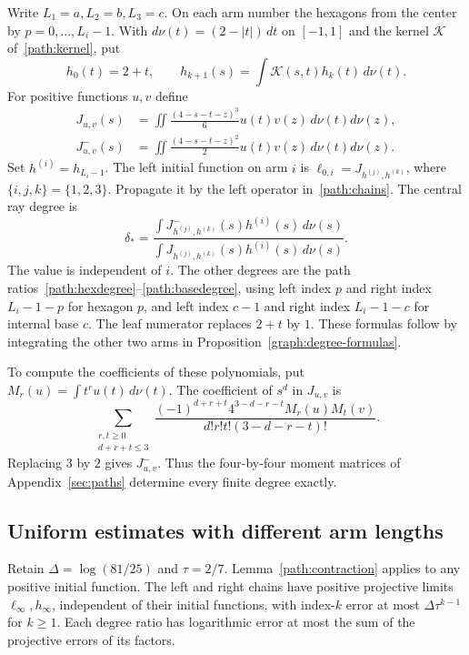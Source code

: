 Write $L_1=a,L_2=b,L_3=c$. On each arm number the hexagons from the
center by $p=0,\ldots,L_i-1$. With $d\nu(t)=(2-|t|)\,dt$ on $[-1,1]$
and the kernel $\mathcal K$ of~\eqref{path:kernel}, put
\[
 h_0(t)=2+t,\qquad
 h_{k+1}(s)=\int\mathcal K(s,t)h_k(t)\,d\nu(t).
\]
For positive functions $u,v$ define
\begin{align}
 J_{u,v}(s)&=\iint\frac{(4-s-t-z)^3}{6}
                u(t)v(z)\,d\nu(t)d\nu(z),\label{spider:J}\\
 J^-_{u,v}(s)&=\iint\frac{(4-s-t-z)^2}{2}
                u(t)v(z)\,d\nu(t)d\nu(z).\label{spider:Jminus}
\end{align}
Set $h^{(i)}=h_{L_i-1}$. The left initial function on arm $i$ is
$\ell_{0,i}=J_{h^{(j)},h^{(k)}}$, where $\{i,j,k\}=\{1,2,3\}$.
Propagate it by the left operator in~\eqref{path:chains}. The central
ray degree is
\begin{equation}\label{spider:central-degree}
 \delta_*=
 \frac{\int J^-_{h^{(j)},h^{(k)}}(s)h^{(i)}(s)\,d\nu(s)}
      {\int J_{h^{(j)},h^{(k)}}(s)h^{(i)}(s)\,d\nu(s)}.
\end{equation}
The value is independent of $i$. The other degrees are the path
ratios~\eqref{path:hexdegree}--\eqref{path:basedegree}, using left
index $p$ and right index $L_i-1-p$ for hexagon $p$, and left index
$c-1$ and right index $L_i-1-c$ for internal base $c$. The leaf
numerator replaces $2+t$ by $1$. These formulas follow by integrating
the other two arms in Proposition~\ref{graph:degree-formulas}.

To compute the coefficients of these polynomials, put
$M_r(u)=\int t^ru(t)\,d\nu(t)$.
The coefficient of $s^d$ in $J_{u,v}$ is
\begin{equation}\label{spider:coefficients}
 \sum_{\substack{r,t\ge0\\d+r+t\le3}}
 \frac{(-1)^{d+r+t}4^{3-d-r-t}M_r(u)M_t(v)}
      {d!r!t!(3-d-r-t)!}.
\end{equation}
Replacing $3$ by $2$ gives $J^-_{u,v}$. Thus the four-by-four moment
matrices of Appendix~\ref{sec:paths} determine every
finite degree exactly.

\subsection{Uniform estimates with different arm lengths}

Retain $\Delta=\log(81/25)$ and $\tau=2/7$. Lemma~\ref{path:contraction}
applies to any positive initial function. The left and right chains
have positive projective limits $\ell_\infty,h_\infty$, independent
of their initial functions, with index-$k$ error at most
$\Delta\tau^{k-1}$ for $k\ge1$. Each degree ratio has logarithmic
error at most the sum of the projective errors of its factors.

